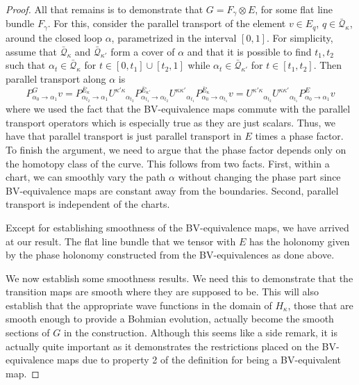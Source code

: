 \documentclass[11pt]{article}
\theoremstyle{remark}
\begin{document}
\begin{proof}
All that remains is to demonstrate that $G = F_{\ensuremath{\gamma}} \otimes E$,
for some flat line bundle $F_{\ensuremath{\gamma}}$. For this, consider the
parallel transport of the element $v \in E_{\ensuremath{q}}$, $\ensuremath{q} \in
\ensuremath{\bar{\ensuremath{\mathcal{Q}}}_{\ensuremath{\kappa}}}$, around the closed loop
$\alpha$, parametrized in the interval $[0,1]$. 
For simplicity, assume that $\ensuremath{\bar{\ensuremath{\mathcal{Q}}}_{\ensuremath{\kappa}}}$ and
$\ensuremath{\bar{\ensuremath{\mathcal{Q}}}_{{\ensuremath{\kappa'}}}}$ form a cover of $\alpha$ and that it is possible to
find $t_1, t_2$
such that $\alpha_t \in \ensuremath{\bar{\ensuremath{\mathcal{Q}}}_{\ensuremath{\kappa}}}$ for $t \in [0,t_1] \cup [t_2, 1]$
while $\alpha_t \in \ensuremath{\bar{\ensuremath{\mathcal{Q}}}_{{\ensuremath{\kappa'}}}}$ for $t \in [t_1, t_2]$.  
Then parallel transport along $\alpha$ is 
\[
P_{\alpha_0 \to \alpha_1}^G v =
P_{\alpha_{t_2} \to \alpha_1}^{\ensuremath{\bar{E}_{{\ensuremath{\kappa}}}}} 
\ensuremath{U^{\ensuremath{\kappa}{'}  \ensuremath{\kappa}{}}}_{\alpha_{t_2}}  
P_{\alpha_{t_1} \to \alpha_{t_2}}^{\ensuremath{\bar{E}_{{\ensuremath{\kappa'}}}}}
\ensuremath{U^{\ensuremath{\kappa}{}  \ensuremath{\kappa}{'}}}_{\alpha_{t_1}} P_{\alpha_{0} \to \alpha_{t_1}}^{\ensuremath{\bar{E}_{{\ensuremath{\kappa}}}}} v
= \ensuremath{U^{\ensuremath{\kappa}{'}  \ensuremath{\kappa}{}}}_{\alpha_{t_2}} \ensuremath{U^{\ensuremath{\kappa}{}  \ensuremath{\kappa}{'}}}_{\alpha_{t_1}} P_{\alpha_0 \to
\alpha_1}^E v 
\]
where we used the fact that the BV-equivalence maps commute with the
parallel transport operators which is especially true as they are just
scalars. Thus, we have that parallel transport is just parallel
transport in $E$ times a phase factor. To finish the argument, we need
to argue that the phase factor depends only on the homotopy class of
the curve. This follows from two facts. First, within a chart, we can
smoothly vary the path $\alpha$ without changing the phase part since
BV-equivalence maps are constant away from the boundaries. Second,
parallel transport is independent of the charts.


 Except for establishing smoothness of the BV-equivalence maps, 
we have arrived at our result. The flat line bundle that we tensor
with $E$ has the holonomy given by the phase holonomy constructed from
the BV-equivalences as done above. 


We now  establish some smoothness results. We need this to
demonstrate that the transition maps are smooth where they are
supposed to be. This will also establish that the appropriate wave functions in
the domain of \ensuremath{H_{\ensuremath{\kappa}}}, those that are smooth enough to provide a Bohmian
evolution, actually become the smooth sections of $G$ in the
construction. Although this seems like a side remark, it is actually
quite important as it demonstrates the restrictions placed on the
BV-equivalence maps due to property 2 of the definition for being a
BV-equivalent map. 


\end{proof}
\end{document}
